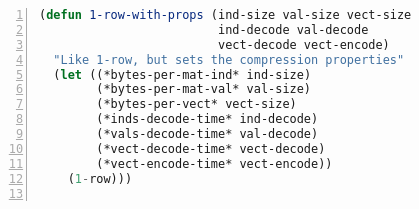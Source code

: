 \begin{lstlisting}[language=Lisp,
					showstringspaces=false,
					numbers=left,
					numberstyle=\tiny]
(defun 1-row-with-props (ind-size val-size vect-size
                         ind-decode val-decode
                         vect-decode vect-encode)
  "Like 1-row, but sets the compression properties"
  (let ((*bytes-per-mat-ind* ind-size)
        (*bytes-per-mat-val* val-size)
        (*bytes-per-vect* vect-size)
        (*inds-decode-time* ind-decode)
        (*vals-decode-time* val-decode)
        (*vect-decode-time* vect-decode)
        (*vect-encode-time* vect-encode))
    (1-row)))


\end{lstlisting}